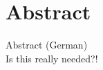 %
\chapter*{Abstract}
\label{sec:abstract}
\vspace*{-10mm}


\vspace*{20mm}

{Abstract (German)}\label{sec:abstract-german} \\

Is this really needed?!
